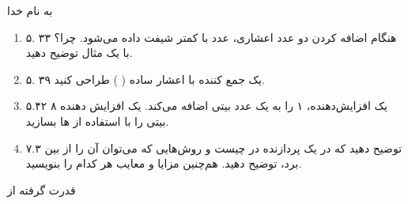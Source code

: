 \documentclass{article}[12pt]
\begin{document}
\begin{centering}
به نام خدا\\
\end{centering}
\begin{enumerate}
\item
۵. ۳۳
هنگام اضافه کردن دو عدد اعشاری، عدد با 
کمتر شیفت داده می‌شود. چرا؟ با یک مثال توضیح دهید.
\item
۵. ۳۹
یک جمع کننده با اعشار ساده (
) طراحی کنید.

\item
۵.۴۲
یک افزایش‌دهنده، ۱ را به یک عدد
 بیتی اضافه می‌کند. یک افزایش دهنده ۸ بیتی را با استفاده از 
ها بسازید.

\item
۷.۳
توضیح دهید که 
در یک پردازنده در چیست و روش‌هایی که می‌توان آن را از بین برد، توضیح دهید. هم‌چنین مزایا و معایب هر کدام را بنویسید.

\end{enumerate}
\begin{centering}
قدرت گرفته از \lr{\LaTeX}

\end{centering}
\end{document}
